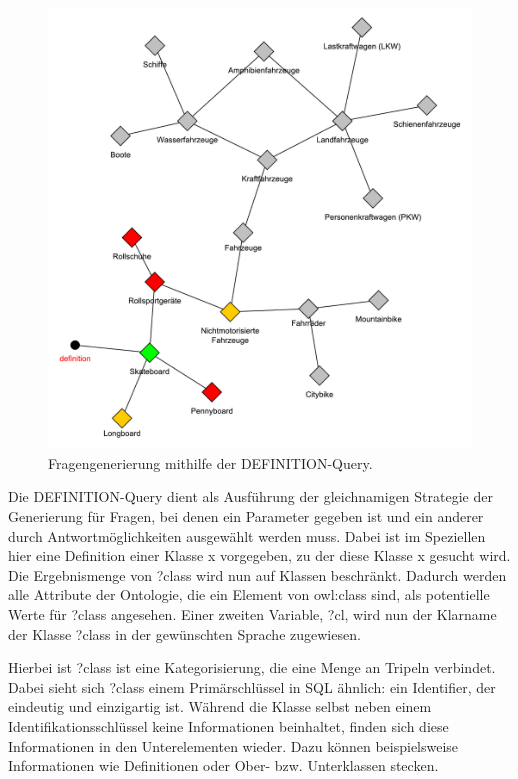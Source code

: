\documentclass[headsepline,titlepage,ngerman,twoside,12pt]{report}
\begin{document}
\begin{figure}
\centering
\includegraphics[width=\textwidth]{images/definition.pdf}
\caption{Fragengenerierung mithilfe der DEFINITION-Query.}
\label{img:definition-query-prototype}
\end{figure}

Die DEFINITION-Query dient als Ausführung der gleichnamigen Strategie der Generierung für Fragen, bei denen ein Parameter gegeben ist und ein anderer durch Antwortmöglichkeiten ausgewählt werden muss. 
Dabei ist im Speziellen hier eine Definition einer Klasse x vorgegeben, zu der diese Klasse x gesucht wird.
Die Ergebnismenge von ?class wird nun auf Klassen beschränkt.
Dadurch werden alle Attribute der Ontologie, die ein Element von owl:class sind, als potentielle Werte für ?class angesehen.
Einer zweiten Variable, ?cl, wird nun der Klarname der Klasse ?class in der gewünschten Sprache zugewiesen.

Hierbei ist ?class ist eine Kategorisierung, die eine Menge an Tripeln verbindet.
Dabei sieht sich ?class einem Primärschlüssel in SQL ähnlich: ein Identifier, der eindeutig und einzigartig ist.
Während die Klasse selbst neben einem Identifikationsschlüssel keine Informationen beinhaltet, finden sich diese Informationen in den Unterelementen wieder.
Dazu können beispielsweise Informationen wie Definitionen oder Ober- bzw. Unterklassen stecken.\\
\end{document}
